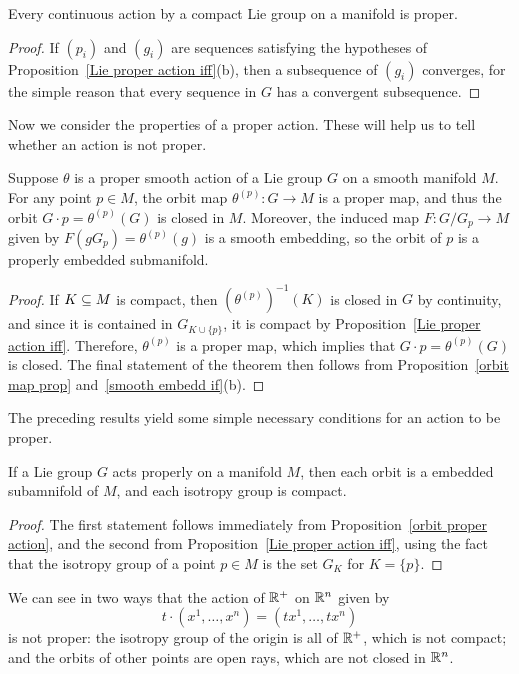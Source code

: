 \begin{corollary}
Every continuous action by a compact Lie group on a manifold is proper.
\end{corollary}
\begin{proof}
If $(p_i)$ and $(g_i)$ are sequences satisfying the hypotheses of Proposition~\ref{Lie proper action iff}(b), then a subsequence of $(g_i)$ converges, for the simple reason that every sequence in $G$ has a convergent subsequence.
\end{proof}
Now we consider the properties of a proper action. These will help us to tell whether an action is 
not proper.
\begin{proposition}\label{orbit proper action}
Suppose $\theta$ is a proper smooth action of a Lie group $G$ on a smooth manifold $M$. For any point $p\in M$, the orbit map $\theta^{(p)}:G\to M$ is a proper map, and thus the  orbit $G\cdot p=\theta^{(p)}(G)$ is closed in $M$. Moreover, the induced map $F:G/G_p\to M$ given by $F(gG_p)=\theta^{(p)}(g)$ is a smooth embedding, so the orbit of $p$ is a properly embedded submanifold.
\end{proposition}
\begin{proof}
If $K\subseteq M$ is compact, then $(\theta^{(p)})^{-1}(K)$ is closed in $G$ by continuity, and since it is contained in $G_{K\cup\{p\}}$, it is compact by Proposition~\ref{Lie proper action iff}. Therefore, $\theta^{(p)}$ is a proper map, which implies that $G\cdot p=\theta^{(p)}(G)$ is closed. The final statement of the theorem then follows from Proposition~\ref{orbit map prop} and~\ref{smooth embedd if}(b).
\end{proof}
The preceding results yield some simple necessary conditions for an action to be proper.
\begin{proposition}
If a Lie group $G$ acts properly on a manifold $M$, then each orbit is a embedded subamnifold of $M$, and each isotropy group is compact.
\end{proposition}
\begin{proof}
The first statement follows immediately from Proposition~\ref{orbit proper action}, and the second from Proposition~\ref{Lie proper action iff}, using the fact that the isotropy group of a point $p\in M$ is the set $G_K$ for $K=\{p\}$.
\end{proof}
\begin{example}
We can see in two ways that the action of $\mathbb{R}^+$ on $\mathbb{R}^n$ given by
\[t\cdot(x^1,\dots,x^n)=(tx^1,\dots,tx^n)\]
is not proper: the isotropy group of the origin is all of $\mathbb{R}^+$, which is not compact; and the orbits of other points are open rays, which are not closed in $\mathbb{R}^n$.
\end{example}
